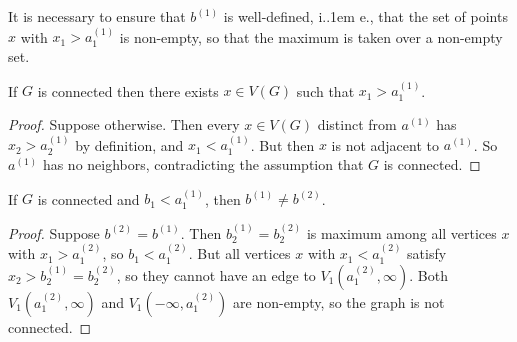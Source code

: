 \documentclass{article}
\makeatletter
\newcommand*\ie{i.\kern.1em e.\@\xspace} %
\makeatother
\begin{document}
It is necessary to ensure that $b^{(1)}$ is well-defined, \ie, that the set of points $x$ with $x_1
> a^{(1)}_1$ is non-empty, so that the maximum is taken over a non-empty set.
\begin{proposition}
	If $G$ is connected then there exists $x \in V(G)$ such that $x_1 > a^{(1)}_1$.
\end{proposition}
\begin{proof}
	Suppose otherwise. Then every $x \in V(G)$ distinct from $a^{(1)}$ has $x_2 > a^{(1)}_2$ by
	definition, and $x_1 < a^{(1)}_1$. But then $x$ is not adjacent to $a^{(1)}$. So $a^{(1)}$ has no
	neighbors, contradicting the assumption that $G$ is connected.
\end{proof}

\begin{proposition}
	If $G$ is connected and $b_1 < a^{(1)}_1$, then $b^{(1)} \neq b^{(2)}$.
\end{proposition}
\begin{proof}
	Suppose $b^{(2)}=b^{(1)}$. Then $b^{(1)}_2=b^{(2)}_2$ is maximum among all vertices $x$ with $x_1 >
	a^{(2)}_1$, so $b_1 < a^{(2)}_1$. But all vertices $x$ with $x_1 < a^{(2)}_1$ satisfy $x_2 >
	b^{(1)}_2=b^{(2)}_2$, so they cannot have an edge to $V_1(a^{(2)}_1,\infty)$. Both
	$V_1(a^{(2)}_1,\infty)$ and $V_1(-\infty, a^{(2)}_1)$ are non-empty, so the graph is not connected.
\end{proof}
\end{document}
